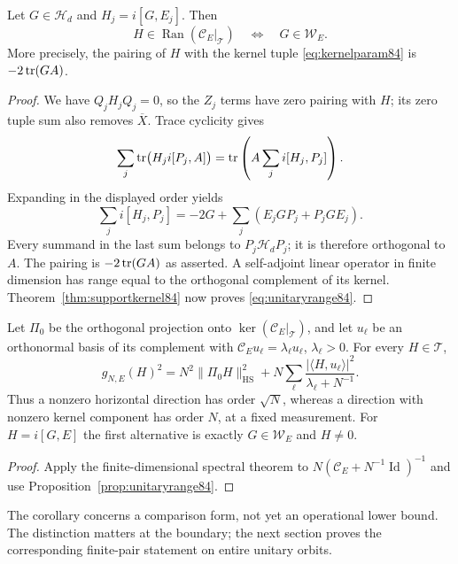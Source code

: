 \begin{proposition}\label{prop:unitaryrange84}
Let $G\in\mathcal H_d$ and $H_j=i[G,E_j]$.  Then
\begin{equation}\label{eq:unitaryrange84}
 H\in\operatorname{Ran}(\mathcal C_E|_{\mathcal T})
 \quad\Longleftrightarrow\quad G\in\mathcal W_E.
\end{equation}
More precisely, the pairing of $H$ with the kernel tuple
\eqref{eq:kernelparam84} is $-2\operatorname{tr}(GA)$.
\end{proposition}
\begin{proof}
We have $Q_jH_jQ_j=0$, so the $Z_j$ terms have zero pairing with $H$;
its zero tuple sum also removes $\overline X$.  Trace cyclicity gives
\[
 \sum_j\operatorname{tr}\bigl(H_ji[P_j,A]\bigr)
 =\operatorname{tr}\left(A\sum_ji[H_j,P_j]\right).
\]
Expanding in the displayed order yields
\[
 \sum_ji[H_j,P_j]
 =-2G+\sum_j(E_jGP_j+P_jGE_j).
\]
Every summand in the last sum belongs to
$P_j\mathcal H_dP_j$; it is therefore orthogonal to $A$.
The pairing is $-2\operatorname{tr}(GA)$ as asserted.  A self-adjoint linear
operator in finite dimension has range equal to the orthogonal
complement of its kernel.  Theorem~\ref{thm:supportkernel84} now
proves \eqref{eq:unitaryrange84}.
\end{proof}

\begin{corollary}\label{cor:tangentscales84}
Let $\Pi_0$ be the orthogonal projection onto
$\ker(\mathcal C_E|_{\mathcal T})$, and let $u_\ell$ be an orthonormal
basis of its complement with $\mathcal C_Eu_\ell=\lambda_\ell u_\ell$,
$\lambda_\ell>0$.  For every $H\in\mathcal T$,
\begin{equation}\label{eq:tangentspectral84}
 g_{N,E}(H)^2
 =N^2\|\Pi_0H\|_{\mathrm{HS}}^2+
  N\sum_\ell\frac{|\langle H,u_\ell\rangle|^2}{\lambda_\ell+N^{-1}}.
\end{equation}
Thus a nonzero horizontal direction has order $\sqrt N$, whereas a
direction with nonzero kernel component has order $N$, at a fixed
measurement.  For $H=i[G,E]$ the first alternative is exactly
$G\in\mathcal W_E$ and $H\ne0$.
\end{corollary}
\begin{proof}
Apply the finite-dimensional spectral theorem to
$N(\mathcal C_E+N^{-1}\operatorname{Id})^{-1}$ and use
Proposition~\ref{prop:unitaryrange84}.
\end{proof}
The corollary concerns a comparison form, not yet an operational
lower bound.  The distinction matters at the boundary; the next
section proves the corresponding finite-pair statement on entire
unitary orbits.

